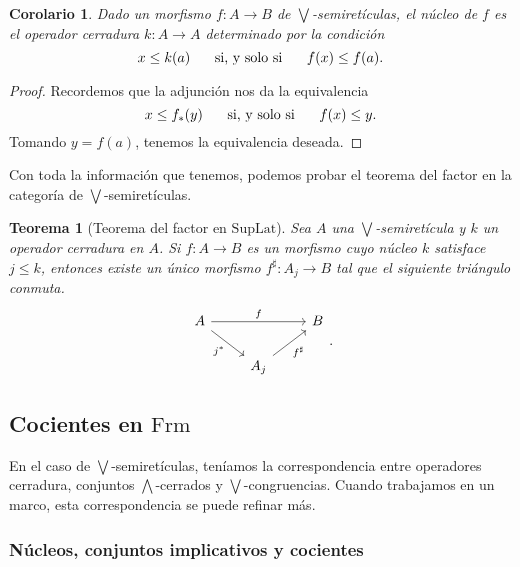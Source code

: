 \documentclass[12pt,letterpaper,titlepage]{article}
\newtheorem*{cor}{Corolario}
\newtheorem{thm}{Teorema}
\theoremstyle{definition}
\newcommand\Sup{\bigvee}
\newcommand\Inf{\bigwedge}
\newcommand\ssi{\hspace{5mm}\text{ si, y solo si }\hspace{5mm}}
\newcommand\tps[2]{\texorpdfstring{#1}{#2}}
\newcommand\<{\langle}
\renewcommand\>{\rangle}
\newcommand{\Frm}{\mathrm{Frm}}
\newcommand{\SupLat}{\mathrm{SupLat}}
\begin{document}
\begin{cor}
    Dado un morfismo $f:A\to B$ de $\Sup$-semiretículas, el núcleo de $f$
    es el operador cerradura $k:A\to A$ determinado por la condición
    \[
        x\leq k(a) \ssi f(x) \leq f(a)
    .\]
\end{cor}
\begin{proof}
    Recordemos que la adjunción nos da la equivalencia
    \[
        x\leq f_*(y) \ssi f(x) \leq y
    .\]
    Tomando $y=f(a)$, tenemos la equivalencia deseada.
\end{proof}

Con toda la información que tenemos,
podemos probar el teorema del factor
en la categoría de $\Sup$-semiretículas.
\begin{thm}[Teorema del factor en $\SupLat$]
    Sea $A$ una $\Sup$-semiretícula y $k$ un operador cerradura en $A$.
    Si $f:A\to B$ es un morfismo cuyo núcleo $k$ satisface $j\leq k$,
    entonces existe un único morfismo $f^\sharp:A_j\to B$ tal que
    el siguiente triángulo conmuta.
    \[
        \begin{tikzcd}
            A \ar[rr,"f"] \ar[dr,"j^*"'] &&  B \\
            &A_j \ar[ur,"f^\sharp"']
        \end{tikzcd}
    .\]
\end{thm}
    

\subsection{Cocientes en \tps{$\Frm$}{Frm}}
En el caso de $\Sup$-semiretículas, teníamos la correspondencia
entre operadores cerradura, conjuntos $\Inf$-cerrados
y $\Sup$-congruencias.
Cuando trabajamos en un marco, esta correspondencia se puede refinar
más.

\subsubsection{Núcleos, conjuntos implicativos y cocientes}
\end{document}
